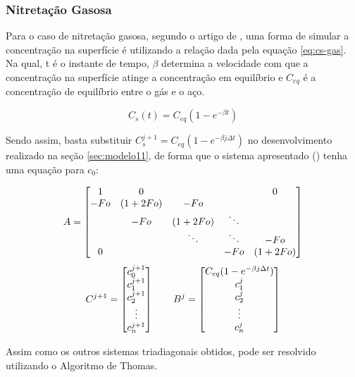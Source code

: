 \subsubsection{Nitretação Gasosa}
\label{sec:nit-gas}
Para o caso de nitretação gasosa, segundo o artigo de \cite{christiansen2008nitrogen}, uma forma de simular a concentração na superfície é utilizando a relação dada pela equação \autoref{eq:cs-gas}. Na qual, t é o instante de tempo, $\beta$ determina a velocidade com que a concentração na superfície atinge a concentração em equilíbrio e $C_{eq}$ é a concentração de equilíbrio entre o gás e o aço.

\begin{equation}
\label{eq:cs-gas}
C_{s}(t) = C_{eq}(1 - e^{-\beta t})
\end{equation}

Sendo assim, basta substituir $C_s^{j+1} = C_{eq}(1 - e^{-\beta j\Delta t})$ no desenvolvimento realizado na seção \autoref{sec:modelo11}, de forma que o sistema apresentado () tenha uma equação para $c_0$:

\begin{equation*}
	\cmrtext{A} =
	\begin{bmatrix}
		  1 & 0 &         &        & 0\\
		-Fo & (1+2Fo) &  -Fo   &        & \\
		    & -Fo &   (1+2Fo)   & \ddots & \\
		    &     &  \ddots & \ddots & -Fo \\
	     0  &     &         &  -Fo   & (1+2Fo) 
	\end{bmatrix}
\end{equation*}
\begin{equation*}
	\cmrtext{C^{j+1}} =
	\begin{bmatrix}
		c_0^{j+1} \\
		c_1^{j+1} \\
		c_2^{j+1} \\
		\vdots \\
		c_n^{j+1}
	\end{bmatrix}
	\qquad
	\cmrtext{B^j} =	
	\begin{bmatrix}
		C_{eq}(1 - e^{-\beta j\Delta t}) \\
		c_1^j \\
		c_2^{j} \\
		\vdots \\
		c_n^{j}
	\end{bmatrix}
\end{equation*}

Assim como os outros sistemas triadiagonais obtidos, pode ser resolvido utilizando o Algoritmo de Thomas.